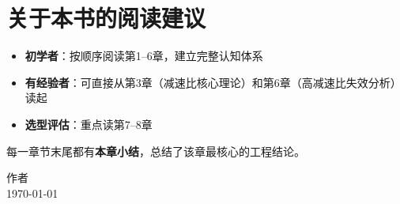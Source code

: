 \section*{关于本书的阅读建议}

\begin{itemize}
  \item \textbf{初学者}：按顺序阅读第1--6章，建立完整认知体系
  \item \textbf{有经验者}：可直接从第3章（减速比核心理论）和第6章（高减速比失效分析）读起
  \item \textbf{选型评估}：重点读第7--8章
\end{itemize}

每一章节末尾都有\textbf{本章小结}，总结了该章最核心的工程结论。

\begin{flushright}
作者\\
\today
\end{flushright}

\newpage
